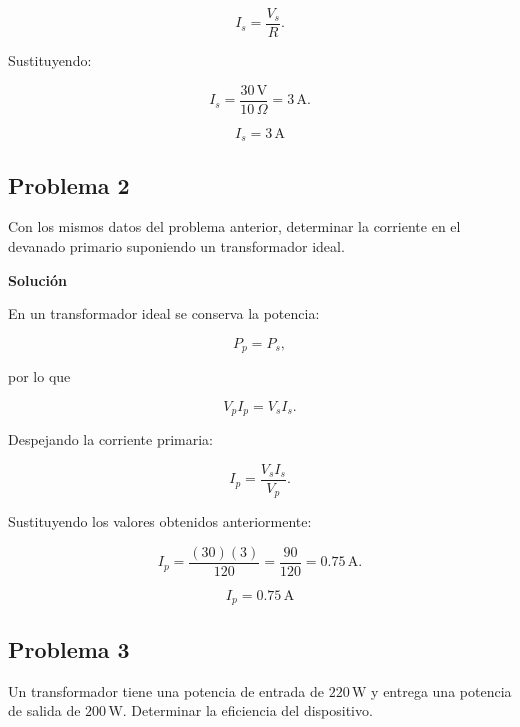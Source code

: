 \begin{equation}
I_s=\frac{V_s}{R}.
\end{equation}

Sustituyendo:

\begin{equation}
I_s=\frac{30\,\mathrm{V}}{10\,\Omega}
=3\,\mathrm{A}.
\end{equation}


\begin{equation}
\boxed{I_s = 3\,\mathrm{A}}
\end{equation}

\subsection{Problema 2}

Con los mismos datos del problema anterior, determinar la corriente en el devanado primario suponiendo un transformador ideal.

\textbf{Solución}

En un transformador ideal se conserva la potencia:

\begin{equation}
P_p=P_s,
\end{equation}

por lo que

\begin{equation}
V_pI_p=V_sI_s.
\end{equation}

Despejando la corriente primaria:

\begin{equation}
I_p=\frac{V_sI_s}{V_p}.
\end{equation}

Sustituyendo los valores obtenidos anteriormente:

\begin{equation}
I_p=\frac{(30)(3)}{120}
=\frac{90}{120}
=0.75\,\mathrm{A}.
\end{equation}

\begin{equation}
\boxed{I_p = 0.75\,\mathrm{A}}
\end{equation}

\subsection{Problema 3}

Un transformador tiene una potencia de entrada de $220\,\mathrm{W}$ y entrega una potencia de salida de $200\,\mathrm{W}$. Determinar la eficiencia del dispositivo.


